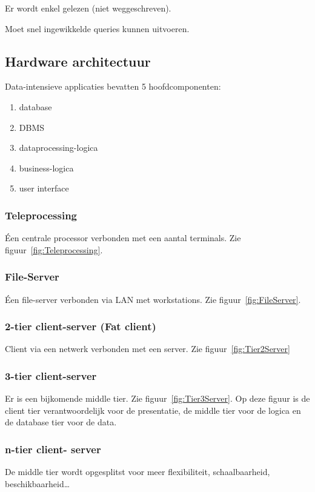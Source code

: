 \documentclass[a4paper,12pt]{article}
\begin{document}
Er wordt enkel gelezen (niet weggeschreven).

Moet snel ingewikkelde queries kunnen uitvoeren.

\subsection{Hardware architectuur}
Data-intensieve applicaties bevatten 5 hoofdcomponenten:

\begin{enumerate}
\item database
\item DBMS
\item dataprocessing-logica
\item business-logica
\item user interface
\end{enumerate}

\subsubsection{Teleprocessing}
Éen centrale processor verbonden met een aantal terminals.
Zie figuur~\ref{fig:Teleprocessing}.

\subsubsection{File-Server}
Éen file-server verbonden via LAN met workstations.
Zie figuur~\ref{fig:FileServer}.

\subsubsection{2-tier client-server (Fat client)}
Client via een netwerk verbonden met een server.
Zie figuur~\ref{fig:Tier2Server}

\subsubsection{3-tier client-server}
Er is een bijkomende middle tier.
Zie figuur~\ref{fig:Tier3Server}.
Op deze figuur is de client tier verantwoordelijk voor de presentatie, de middle tier voor de logica en de database tier voor de data.

\subsubsection{n-tier client- server}
De middle tier wordt opgesplitst voor meer flexibiliteit, schaalbaarheid, beschikbaarheid\dots
\end{document}
